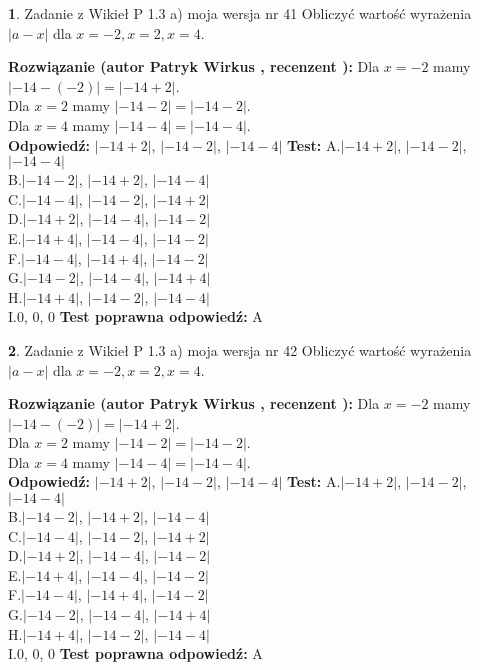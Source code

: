 \documentclass[12pt, a4paper]{article}
\theoremstyle{definition} %
\newtheorem{zad}{}
\newcommand{\zadStart}[1]{\begin{zad}#1\newline}
\newcommand{\zadStop}{\end{zad}}
\newcommand{\rozwStart}[2]{\noindent \textbf{Rozwiązanie (autor #1 , recenzent #2): }\newline}
\newcommand{\rozwStop}{\newline}
\newcommand{\odpStart}{\noindent \textbf{Odpowiedź:}\newline}
\newcommand{\odpStop}{\newline}
\newcommand{\testStart}{\noindent \textbf{Test:}\newline}
\newcommand{\testStop}{\newline}
\newcommand{\kluczStart}{\noindent \textbf{Test poprawna odpowiedź:}\newline}
\newcommand{\kluczStop}{\newline}
\begin{document}
\zadStart{Zadanie z Wikieł P 1.3 a) moja wersja nr 41}
Obliczyć wartość wyrażenia $|a - x|$ dla $x=-2,x=2,x=4$.
\zadStop
\rozwStart{Patryk Wirkus}{}
Dla $x = -2$ mamy $|-14 - (-2)| = |-14 + 2|$.\\
Dla $x = 2$ mamy $|-14 - 2| = |-14 - 2|$.\\
Dla $x = 4$ mamy $|-14 - 4| = |-14 - 4|$.\\
\rozwStop
\odpStart
$|-14 + 2|$, $|-14 - 2|$, $|-14 - 4|$
\odpStop
\testStart
A.$|-14 + 2|$, $|-14 - 2|$, $|-14 - 4|$\\
B.$|-14 - 2|$, $|-14 + 2|$, $|-14 - 4|$\\
C.$|-14 - 4|$, $|-14 - 2|$, $|-14 + 2|$\\
D.$|-14 + 2|$, $|-14 - 4|$, $|-14 - 2|$\\
E.$|-14 + 4|$, $|-14 - 4|$, $|-14 - 2|$\\
F.$|-14 - 4|$, $|-14 + 4|$, $|-14 - 2|$\\
G.$|-14 - 2|$, $|-14 - 4|$, $|-14 + 4|$\\
H.$|-14 + 4|$, $|-14 - 2|$, $|-14 - 4|$\\
I.$0$, $0$, $0$
\testStop
\kluczStart
A
\kluczStop



\zadStart{Zadanie z Wikieł P 1.3 a) moja wersja nr 42}
Obliczyć wartość wyrażenia $|a - x|$ dla $x=-2,x=2,x=4$.
\zadStop
\rozwStart{Patryk Wirkus}{}
Dla $x = -2$ mamy $|-14 - (-2)| = |-14 + 2|$.\\
Dla $x = 2$ mamy $|-14 - 2| = |-14 - 2|$.\\
Dla $x = 4$ mamy $|-14 - 4| = |-14 - 4|$.\\
\rozwStop
\odpStart
$|-14 + 2|$, $|-14 - 2|$, $|-14 - 4|$
\odpStop
\testStart
A.$|-14 + 2|$, $|-14 - 2|$, $|-14 - 4|$\\
B.$|-14 - 2|$, $|-14 + 2|$, $|-14 - 4|$\\
C.$|-14 - 4|$, $|-14 - 2|$, $|-14 + 2|$\\
D.$|-14 + 2|$, $|-14 - 4|$, $|-14 - 2|$\\
E.$|-14 + 4|$, $|-14 - 4|$, $|-14 - 2|$\\
F.$|-14 - 4|$, $|-14 + 4|$, $|-14 - 2|$\\
G.$|-14 - 2|$, $|-14 - 4|$, $|-14 + 4|$\\
H.$|-14 + 4|$, $|-14 - 2|$, $|-14 - 4|$\\
I.$0$, $0$, $0$
\testStop
\kluczStart
A
\kluczStop
\end{document}

